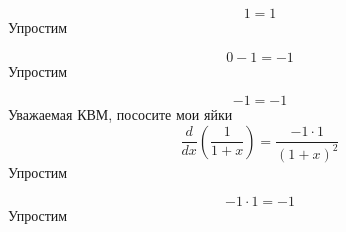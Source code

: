 \documentclass[12pt, a4paper]{article}
\begin{document}
\begin{equation}
1 = 1
\end{equation}
Упростим

\begin{equation}
0-1 = -1
\end{equation}
Упростим

\begin{equation}
-1 = -1
\end{equation}
Уважаемая КВМ, пососите мои яйки
\begin{equation}
\frac{d}{dx}(\frac{1}{1+x}) = \frac{-1 \cdot 1}{{(1+x)}^{2}}
\end{equation}
Упростим

\begin{equation}
-1 \cdot 1 = -1
\end{equation}
Упростим
\end{document}

